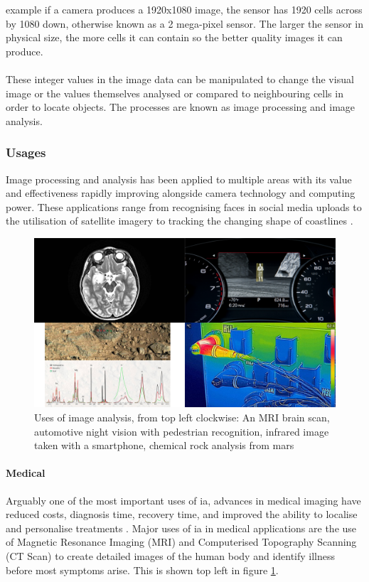 	example if a camera produces a 1920x1080 image, the sensor has 1920 cells across by 1080 down, otherwise known as a 2 mega-pixel sensor. The larger the sensor in physical size, the more cells it can contain so the better quality images it can produce.
	\\\\
	These integer values in the image data can be manipulated to change the 
	visual image or the values themselves analysed or compared to neighbouring 
	cells in order to locate objects. The processes are known as image processing and image analysis.
	\subsubsection{Usages}
	Image processing and analysis has been applied to multiple areas with its value and 
	effectiveness rapidly improving alongside camera technology and computing power. These 
	applications range from recognising faces in social media uploads \citep{zuckerberg2011tagging} 
	to the utilisation of satellite imagery to tracking the changing shape of coastlines 
	\citep{costalimagery}.
	\begin{figure}[h!]
		\centering
		\includegraphics[width=15cm]{../images/4panel.png}
		\caption[Uses of image analysis]{Uses of image analysis, from top left clockwise: An MRI brain scan, automotive 
		night vision with pedestrian recognition, infrared image taken with a smartphone, chemical 
		rock analysis from 
			mars}
		\label{fig:analysis_uses}
	\end{figure}
	\paragraph{Medical}
	Arguably one of the most important uses of \gls{ia}, advances in medical imaging have reduced costs, diagnosis time, recovery time, and improved the ability to localise and personalise treatments \citep{esfmedical}. Major uses of \gls{ia} in medical applications are the use of Magnetic Resonance Imaging (MRI) and Computerised Topography Scanning (CT Scan) to create detailed images of the human body and identify illness before most symptoms arise. This is shown top left in figure \ref{fig:analysis_uses}.
